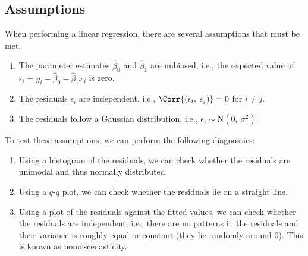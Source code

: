 \documentclass{article}
\begin{document}
\subsection{Assumptions}
When performing a linear regression, there are several assumptions that must be met.
\begin{enumerate}
    \item The parameter estimates \(\hat{\beta}_0\) and \(\hat{\beta}_1\) are unbiased, i.e., the expected value of \(\epsilon_i = y_i - \hat{\beta}_0 - \hat{\beta}_1 x_i\) is zero.
    \item The residuals \(\epsilon_i\) are independent, i.e., \(\Corr{\left( \epsilon_i,\: \epsilon_j \right)} = 0\) for \(i \neq j\).
    \item The residuals follow a Gaussian distribution, i.e., \(\epsilon_i \sim \mathrm{N}\left( 0,\: \sigma^2 \right)\).
\end{enumerate}
To test these assumptions, we can perform the following diagnostics:
\begin{enumerate}
    \item Using a histogram of the residuals, we can check whether the residuals are unimodal and thus normally distributed.
    \item Using a \(q\)-\(q\) plot, we can check whether the residuals lie on a straight line.
    \item Using a plot of the residuals against the fitted values, we can check whether the residuals are independent, i.e.,
          there are no patterns in the residuals and their variance is roughly equal or constant (they lie randomly around 0).
          This is known as homoscedasticity.
\end{enumerate}
\end{document}
